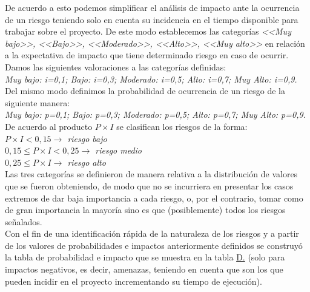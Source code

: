 \documentclass[a4paper, 12pt,twoside]{report}  %
\numberwithin{equation}{subsection} %
\begin{document}
De acuerdo a esto podemos simplificar el análisis de impacto ante la ocurrencia de un riesgo teniendo solo en cuenta su incidencia en el tiempo disponible para trabajar sobre el proyecto. De este modo establecemos las categorías \textit{<<Muy bajo>>, <<Bajo>>, <<Moderado>>, <<Alto>>, <<Muy alto>>} en relación a la expectativa de impacto que tiene determinado riesgo en caso de ocurrir. Damos las siguientes valoraciones a las categorías definidas:\\
\textit{Muy bajo: i=0,1; Bajo: i=0,3; Moderado: i=0,5; Alto: i=0,7; Muy Alto: i=0,9.}\\
\indent Del mismo modo definimos la probabilidad de ocurrencia de un riesgo de la siguiente manera:\\
\textit{Muy bajo: p=0,1; Bajo: p=0,3; Moderado: p=0,5; Alto: p=0,7; Muy Alto: p=0,9.}\\
\indent De acuerdo al producto $P \times I$ se clasifican los riesgos de la forma:\\
\indent\textit{$P \times I < 0,15 \rightarrow$ \colorbox{riesgo_bajo}{riesgo bajo}}\\
\indent\textit{$0,15 \leq P \times I<0,25 \rightarrow$ \colorbox{riesgo_medio}{riesgo medio}}\\
\indent\textit{$0,25 \leq P \times I \rightarrow$ \colorbox{riesgo_alto}{riesgo alto}}\\
Las tres categorías se definieron de manera relativa a la distribución de valores que se fueron obteniendo, de modo que no se incurriera en presentar los casos extremos de dar baja importancia a cada riesgo, o, por el contrario, tomar como de gran importancia la mayoría sino es que (posiblemente) todos los riesgos señalados.\\
\indent Con el fin de una identificación rápida de la naturaleza de los riesgos y a partir de los valores de probabilidades e impactos anteriormente definidos se construyó la tabla de probabilidad e impacto que se muestra en la tabla \hyperref[tabla_matriz_prob_impacto]{D.} (solo para impactos negativos, es decir, amenazas, teniendo en cuenta que son los que pueden incidir en el proyecto incrementando su tiempo de ejecución).
\end{document}
